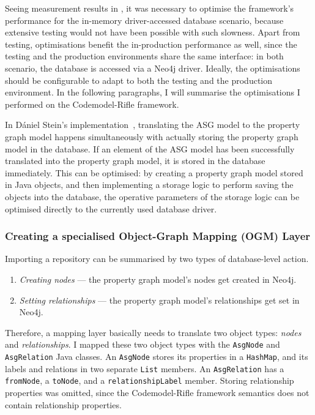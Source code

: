 Seeing measurement results in , it was necessary to optimise the framework's performance for the in-memory driver-accessed database scenario, because extensive testing would not have been possible with such slowness. Apart from testing, optimisations benefit the in-production performance as well, since the testing and the production environments share the same interface: in both scenario, the database is accessed via a Neo4j driver. Ideally, the optimisations should be configurable to adapt to both the testing and the production environment. In the following paragraphs, I will summarise the optimisations I performed on the Codemodel-Rifle framework.

In Dániel Stein's implementation~\cite{stein-daniel-msc}, translating the ASG model to the property graph model happens simultaneously with actually storing the property graph model in the database. If an element of the ASG model has been successfully translated into the property graph model, it is stored in the database immediately. This can be optimised: by creating a property graph model stored in Java objects, and then implementing a storage logic to perform saving the objects into the database, the operative parameters of the storage logic can be optimised directly to the currently used database driver.

\subsubsection{Creating a specialised Object-Graph Mapping (OGM) Layer}

Importing a repository can be summarised by two types of database-level action.

\begin{enumerate}
\item \emph{Creating nodes} — the property graph model's nodes get created in Neo4j.
\item \emph{Setting relationships} — the property graph model's relationships get set in Neo4j.
\end{enumerate}

Therefore, a mapping layer basically needs to translate two object types: \emph{nodes} and \emph{relationships}. I mapped these two object types with the \lstinline{AsgNode} and \lstinline{AsgRelation} Java classes. An \lstinline{AsgNode} stores its properties in a \lstinline{HashMap}, and its labels and relations in two separate \lstinline{List} members. An \lstinline{AsgRelation} has a \lstinline{fromNode}, a \lstinline{toNode}, and a \lstinline{relationshipLabel} member. Storing relationship properties was omitted, since the Codemodel-Rifle framework semantics does not contain relationship properties.

